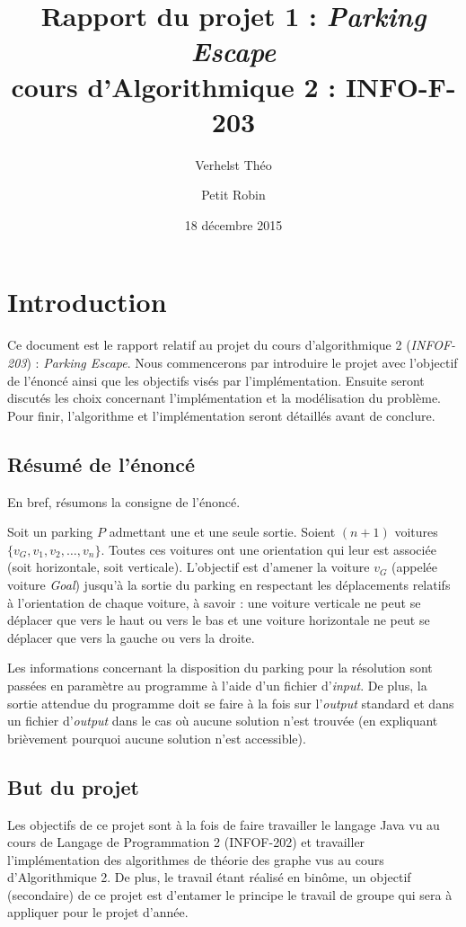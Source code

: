 \documentclass{article}
\title{Rapport du projet 1 : \textit{Parking Escape}\\cours d'Algorithmique 2 : INFO-F-203}
\author{Verhelst Théo \and Petit Robin}
\date{18 décembre 2015}
\begin{document}
\maketitle
\tableofcontents
\newpage
{}

\section{Introduction}
    Ce document est le rapport relatif au projet du cours d'algorithmique 2 (\textit{INFOF-203}) : \textit{Parking Escape}. Nous commencerons par
    introduire le projet avec l'objectif de l'énoncé ainsi que les objectifs visés par l'implémentation. Ensuite seront discutés les choix concernant
    l'implémentation et la modélisation du problème. Pour finir, l'algorithme et l'implémentation seront détaillés avant de conclure.

    \subsection{Résumé de l'énoncé}
        En bref, résumons la consigne de l'énoncé.

        Soit un parking $P$ admettant une et une seule sortie. Soient $(n+1)$ voitures $\{v_G, v_1, v_2, \ldots, v_n\}$. Toutes ces voitures ont une
        orientation qui leur est associée (soit horizontale, soit verticale). L'objectif est d'amener la voiture $v_G$ (appelée voiture \textit{Goal})
        jusqu'à la sortie du parking en respectant les déplacements relatifs à l'orientation de chaque voiture, à savoir : une voiture verticale ne peut
        se déplacer que vers le haut ou vers le bas et une voiture horizontale ne peut se déplacer que vers la gauche ou vers la droite.

        Les informations concernant la disposition du parking pour la résolution sont passées en paramètre au programme à l'aide d'un fichier d'\textit{input}.
        De plus, la sortie attendue du programme doit se faire à la fois sur l'\textit{output} standard et dans un fichier d'\textit{output} dans le cas où
        aucune solution n'est trouvée (en expliquant brièvement pourquoi aucune solution n'est accessible).

    \subsection{But du projet}
        Les objectifs de ce projet sont à la fois de faire travailler le langage Java vu au cours de Langage de Programmation 2 (INFOF-202) et
        travailler l'implémentation des algorithmes de théorie des graphe vus au cours d'Algorithmique 2. De plus, le travail étant réalisé en binôme,
        un objectif (secondaire) de ce projet est d'entamer le principe le travail de groupe qui sera à appliquer pour le projet d'année.
\end{document}
